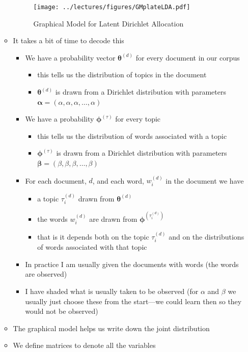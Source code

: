 \documentclass[11pt]{article}
\begin{document}
\begin{itemize}
\begin{itemize}
\begin{figure}[htbp]
\centering
\texttt{[image: ../lectures/figures/GMplateLDA.pdf]}
\caption{Graphical Model for Latent Dirichlet Allocation \label{fig:ldaplate}}
\end{figure}
\item It takes a bit of time to decode this
\begin{itemize}
\item We have a probability vector \(\bm{\theta}^{(d)}\) for every document in our corpus
\begin{itemize}
\item this tells us the distribution of topics in the document
\item \(\bm{\theta}^{(d)}\) is drawn from a Dirichlet distribution
with parameters \(\bm{\alpha}=(\alpha,\alpha,\alpha,\ldots,\alpha)\)
\end{itemize}
\item We have a probability \(\bm{\phi}^{(\tau)}\) for every topic
\begin{itemize}
\item this tells us the distribution of words associated with a topic
\item \(\bm{\phi}^{(\tau)}\) is drawn from a Dirichlet distribution
with parameters \(\bm{\beta} = (\beta,\beta,\beta,\ldots,\beta)\)
\end{itemize}
\item For each document, \(d\), and each word, \(w_{i}^{(d)}\) in the document we have
\begin{itemize}
\item a topic \(\tau^{(d)}_{i}\) drawn from \(\bm{\theta}^{(d)}\)
\item the words \(w_{i}^{(d)}\) are drawn from \(\bm{\phi}^{(\tau^{(d)}_{i})}\)
\item that is it depends both on the topic \(\tau^{(d)}_{i}\) and
on the distributions of words associated with that topic
\end{itemize}
\item In practice I am usually given the documents with words (the
words are observed)
\item I have shaded what is usually taken to be observed (for
\(\alpha\) and \(\beta\) we usually just choose these from the
start---we could learn then so they would not be observed)
\end{itemize}
\item The graphical model helps us write down the joint distribution
\item We define matrices to denote all the variables
\begin{align*}

\end{align*}
\end{itemize}
\end{itemize}
\end{document}
